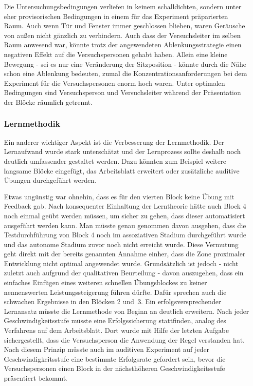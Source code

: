 \documentclass[doc,a4paper,12pt]{apa6}
\begin{document}
Die Untersuchungsbedingungen verliefen in keinem schalldichten, sondern unter eher provisorischen Bedingungen in einem für das Experiment präparierten Raum. Auch wenn Tür und Fenster immer geschlossen blieben, waren Geräusche von außen nicht gänzlich zu verhindern. Auch dass der Versuchsleiter im selben Raum anwesend war, könnte trotz der angewendeten Ablenkungsstrategie einen negativen Effekt auf die Versuchspersonen gehabt haben. Allein eine kleine Bewegung - sei es nur eine Veränderung der Sitzposition - könnte durch die Nähe schon eine Ablenkung bedeuten, zumal die Konzentrationsanforderungen bei dem Experiment für die Versuchspersonen enorm hoch waren. Unter optimalen Bedingungen sind Versuchsperson und Versuchsleiter während der Präsentation der Blöcke räumlich getrennt.

\subsubsection{Lernmethodik}

Ein anderer wichtiger Aspekt ist die Verbesserung der Lernmethodik. Der Lernaufwand wurde stark unterschätzt und der Lernprozess sollte deshalb noch deutlich umfassender gestaltet werden. Dazu könnten zum Beispiel weitere langsame Blöcke eingefügt, das Arbeitsblatt erweitert oder zusätzliche auditive Übungen durchgeführt werden.

Etwas ungünstig war ohnehin, dass es für den vierten Block keine Übung mit Feedback gab. Nach konsequenter Einhaltung der Lerntheorie hätte auch Block 4 noch einmal geübt werden müssen, um sicher zu gehen, dass dieser automatisiert ausgeführt werden kann. Man müsste genau genommen davon ausgehen, dass die Testdurchführung von Block 4 noch im assoziativen Stadium durchgeführt wurde und das autonome Stadium zuvor noch nicht erreicht wurde. Diese Vermutung geht direkt mit der bereits genannten Annahme einher, dass die Zone proximaler Entwicklung \parencite{kozulin2003vygotsky} nicht optimal angewendet wurde. Grundsätzlich ist jedoch - nicht zuletzt auch aufgrund der qualitativen Beurteilung - davon auszugehen, dass ein einfaches Einfügen eines weiteren schnellen Übungsblockes zu keiner nennenswerten Leistungssteigerung führen dürfte. Dafür sprechen auch die schwachen Ergebnisse in den Blöcken 2 und~3. Ein erfolgsversprechender Lernansatz müsste die Lernmethode von Beginn an deutlich erweitern. Nach jeder Geschwindigkeitsstufe müsste eine Erfolgssicherung stattfinden, analog des Verfahrens auf dem Arbeitsblatt. Dort wurde mit Hilfe der letzten Aufgabe sichergestellt, dass die Versuchsperson die Anwendung der Regel verstanden hat. Nach diesem Prinzip müsste auch im auditiven Experiment auf jeder Geschwindigkeitsstufe eine bestimmte Erfolgsrate gefordert sein, bevor die Versuchspersonen einen Block in der nächsthöheren Geschwindigkeitsstufe präsentiert bekommt.
\end{document}
